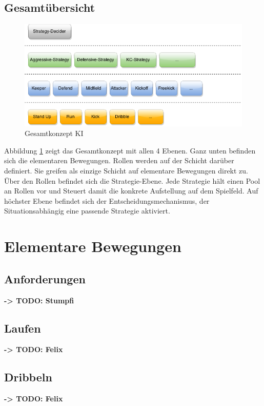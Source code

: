\documentclass[fontsize=12pt,a4paper,final]{scrartcl}[2003/01/01]
\makeatletter
\def\ScaleIfNeeded{%
	\ifdim\Gin@nat@width>\linewidth
		\linewidth
	\else
		\Gin@nat@width
	\fi
}
\makeatother
\begin{document}
\subsection{Gesamtübersicht}\label{sse:KI-Gesamtübersicht}

\begin{figure}[H]
	\centering
	\includegraphics[width=\ScaleIfNeeded]{Grafiken/KI/Ki-Concept}
	\caption{Gesamtkonzept KI}
	\label{Gesamtkonzept KI}
\end{figure}

Abbildung \ref{Gesamtkonzept KI} zeigt das Gesamtkonzept mit allen 4 Ebenen. Ganz unten befinden sich die elementaren Bewegungen. Rollen werden auf der Schicht darüber definiert. Sie greifen als einzige Schicht auf elementare Bewegungen direkt zu. Über den Rollen befindet sich die Strategie-Ebene. Jede Strategie hält einen Pool an Rollen vor und Steuert damit die konkrete Aufstellung auf dem Spielfeld. Auf höchster Ebene befindet sich der Entscheidungsmechanismus, der Situationsabhängig eine passende Strategie aktiviert. 


\section{Elementare Bewegungen}\label{se:Elementare Bewegungen}
\subsection{Anforderungen}
\textbf{-> TODO: Stumpfi}
\subsection{Laufen}\label{sse:Elem Bew:Laufen}
\textbf{-> TODO: Felix}
\subsection{Dribbeln}\label{sse:Elem Bew:Dribbeln}
\textbf{-> TODO: Felix}
\end{document}
